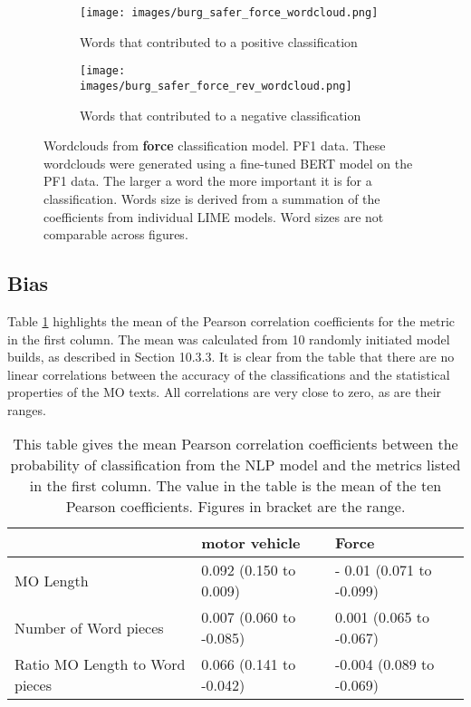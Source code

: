 \begin{figure}
     \centering
     \begin{subfigure}[b]{0.9\textwidth}
         \centering
         \texttt{[image: images/burg\_safer\_force\_wordcloud.png]}
         \caption{Words that contributed to a positive classification}
         \label{fig: wordcloud_force}
     \end{subfigure}
     \vfill
     \begin{subfigure}[b]{0.9\textwidth}
         \centering
         \texttt{[image: images/burg\_safer\_force\_rev\_wordcloud.png]}
         \caption{Words that contributed to a negative classification}
         \label{fig: wordcloud_mv_force}
     \end{subfigure}
        \caption[Wordclouds from \textbf{force} classification model. PF1 data.]{{Wordclouds from \textbf{force} classification model. PF1 data.} These wordclouds were generated using a fine-tuned BERT model on the PF1 data. The larger a word the more important it is for a classification. Words size is derived from a summation of the coefficients from individual LIME models. Word sizes are not comparable across figures.}
        \label{fig:wordcloud_force_both}
        
\end{figure}

\subsection{Bias} Table \ref{tab:PF1_bias} highlights the mean of the Pearson correlation coefficients for the metric in the first column. The mean was calculated from 10 randomly initiated model builds, as described in Section 10.3.3. It is clear from the table that there are no linear correlations between the accuracy of the classifications and the statistical properties of the MO texts. All correlations are very close to zero, as are their ranges. 


\begin{table}[]
\begin{tabular}{@{}lll@{}}
\toprule
                               & motor vehicle            & Force                    \\ \midrule
MO Length                      & 0.092 (0.150 to 0.009)  & - 0.01 (0.071 to -0.099) \\
Number of Word pieces          & 0.007 (0.060 to -0.085) & 0.001 (0.065 to -0.067)  \\
Ratio MO Length to Word pieces & 0.066 (0.141 to -0.042) & -0.004 (0.089 to -0.069) \\ \bottomrule
\end{tabular}

\caption[PF1 data - bias results]{\label{tab:PF1_bias} This table gives the mean Pearson correlation coefficients between the probability of classification from the NLP model and the metrics listed in the first column.  The value in the table is the mean of the ten Pearson coefficients. Figures in bracket are the range.}
\end{table}





